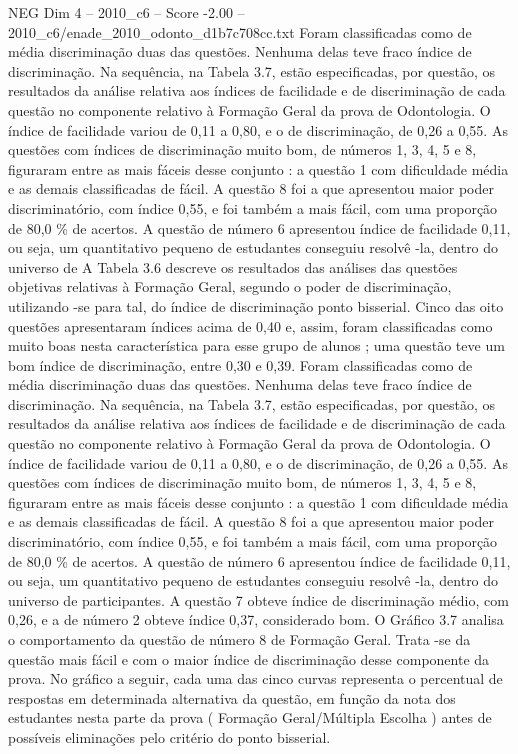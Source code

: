 \begin{textsample}{NEG Dim 4 – 2010\_c6 – Score -2.00 – 2010\_c6/enade\_2010\_odonto\_d1b7c708cc.txt}
Foram classificadas como de média discriminação duas das questões.
Nenhuma delas teve fraco índice de discriminação.
Na sequência, na Tabela 3.7, estão especificadas, por questão, os resultados da análise relativa aos índices de facilidade e de discriminação de cada questão no componente relativo à Formação Geral da prova de Odontologia.
O índice de facilidade variou de 0,11 a 0,80, e o de discriminação, de 0,26 a 0,55.
As questões com índices de discriminação muito bom, de números 1, 3, 4, 5 e 8, figuraram entre as mais fáceis desse conjunto : a questão 1 com dificuldade média e as demais classificadas de fácil.
A questão 8 foi a que apresentou maior poder discriminatório, com índice 0,55, e foi também a mais fácil, com uma proporção de 80,0 \% de acertos.
A questão de número 6 apresentou índice de facilidade 0,11, ou seja, um quantitativo pequeno de estudantes conseguiu resolvê -la, dentro do universo de A Tabela 3.6 descreve os resultados das análises das questões objetivas relativas à Formação Geral, segundo o poder de discriminação, utilizando -se para tal, do índice de discriminação ponto bisserial.
Cinco das oito questões apresentaram índices acima de 0,40 e, assim, foram classificadas como muito boas nesta característica para esse grupo de alunos ; uma questão teve um bom índice de discriminação, entre 0,30 e 0,39.
Foram classificadas como de média discriminação duas das questões.
Nenhuma delas teve fraco índice de discriminação.
Na sequência, na Tabela 3.7, estão especificadas, por questão, os resultados da análise relativa aos índices de facilidade e de discriminação de cada questão no componente relativo à Formação Geral da prova de Odontologia.
O índice de facilidade variou de 0,11 a 0,80, e o de discriminação, de 0,26 a 0,55.
As questões com índices de discriminação muito bom, de números 1, 3, 4, 5 e 8, figuraram entre as mais fáceis desse conjunto : a questão 1 com dificuldade média e as demais classificadas de fácil.
A questão 8 foi a que apresentou maior poder discriminatório, com índice 0,55, e foi também a mais fácil, com uma proporção de 80,0 \% de acertos.
A questão de número 6 apresentou índice de facilidade 0,11, ou seja, um quantitativo pequeno de estudantes conseguiu resolvê -la, dentro do universo de participantes.
A questão 7 obteve índice de discriminação médio, com 0,26, e a de número 2 obteve índice 0,37, considerado bom.
O Gráfico 3.7 analisa o comportamento da questão de número 8 de Formação Geral.
Trata -se da questão mais fácil e com o maior índice de discriminação desse componente da prova.
No gráfico a seguir, cada uma das cinco curvas representa o percentual de respostas em determinada alternativa da questão, em função da nota dos estudantes nesta parte da prova ( Formação Geral/Múltipla Escolha ) antes de possíveis eliminações pelo critério do ponto bisserial.

\end{textsample}
